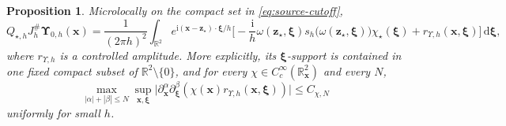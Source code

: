 \documentclass[11pt,reqno]{amsart}
\newtheorem{proposition}{Proposition}[section]
\newcommand{\ii}{\mathrm{i}}
\newcommand{\dd}{\,\mathrm{d}}
\numberwithin{equation}{section}
\begin{document}
\begin{proposition}
Microlocally on the compact set in \eqref{eq:source-cutoff},
\begin{equation}\label{eq:source-state}
    Q_{\star,h}J_h^{\#}\bm{\Upsilon}_{0,h}(\bm x)
    =\frac1{(2\pi h)^2}\int_{\mathbb R^2}e^{\ii(\bm x-\bm z_\star)\cdot\bm\xi/h}\bigg[-\frac{\ii}{h}\omega(\bm z_\star,\bm\xi)
    s_h\bigl(\omega(\bm z_\star,\bm\xi)\bigr)\chi_\star(\bm\xi)+r_{\Upsilon,h}(\bm x,\bm\xi)\bigg]\dd\bm\xi,
\end{equation}
where $r_{\Upsilon,h}$ is a controlled amplitude. More explicitly, its $\bm\xi$-support is contained in one fixed compact subset of $\mathbb R^2\setminus\{0\}$, and for every $\chi\in C_c^\infty(\mathbb R^2_{\bm x})$ and every $N$,
\begin{equation}\label{eq:source-remainder-seminorm}
 \max_{|\alpha|+|\beta|\le N}\sup_{\bm x,\bm\xi}\bigl|\partial_{\bm x}^{\alpha}\partial_{\bm\xi}^{\beta}(\chi(\bm x)r_{\Upsilon,h}(\bm x,\bm\xi))\bigr|\le C_{\chi,N}
\end{equation}
uniformly for small $h$.
\end{proposition}
\end{document}
